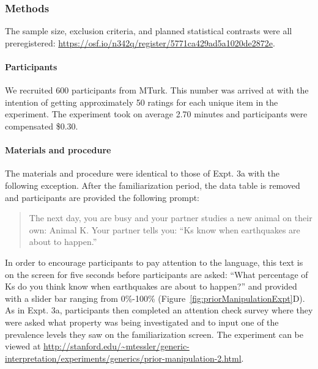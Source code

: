 \documentclass[,man,floatsintext]{apa6}
\let\oldparagraph\paragraph
\renewcommand{\paragraph}[1]{\oldparagraph{#1}\mbox{}}
\theoremstyle{definition}
\theoremstyle{definition}
\theoremstyle{definition}
\theoremstyle{remark}
\begin{document}
\hypertarget{methods-3}{%
\subsubsection{Methods}\label{methods-3}}

The sample size, exclusion criteria, and planned statistical contrasts
were all preregistered:
\url{https://osf.io/n342q/register/5771ca429ad5a1020de2872e}.

\hypertarget{participants-5}{%
\paragraph{Participants}\label{participants-5}}

We recruited 600 participants from MTurk. This number was arrived at
with the intention of getting approximately 50 ratings for each unique
item in the experiment. The experiment took on average 2.70 minutes and
participants were compensated \$0.30.

\hypertarget{materials-and-procedure}{%
\paragraph{Materials and procedure}\label{materials-and-procedure}}

The materials and procedure were identical to those of Expt. 3a with the
following exception. After the familiarization period, the data table is
removed and participants are provided the following prompt:

\begin{quote}
The next day, you are busy and your partner studies a new animal on
their own: Animal K. Your partner tells you: \enquote{Ks know when
earthquakes are about to happen.}
\end{quote}

In order to encourage participants to pay attention to the language,
this text is on the screen for five seconds before participants are
asked: \enquote{What percentage of Ks do you think know when earthquakes
are about to happen?} and provided with a slider bar ranging from
0\%-100\% (Figure~\ref{fig:priorManipulationExpt}D). As in Expt. 3a,
participants then completed an attention check survey where they were
asked what property was being investigated and to input one of the
prevalence levels they saw on the familiarization screen. The experiment
can be viewed at
\url{http://stanford.edu/~mtessler/generic-interpretation/experiments/generics/prior-manipulation-2.html}.
\end{document}
